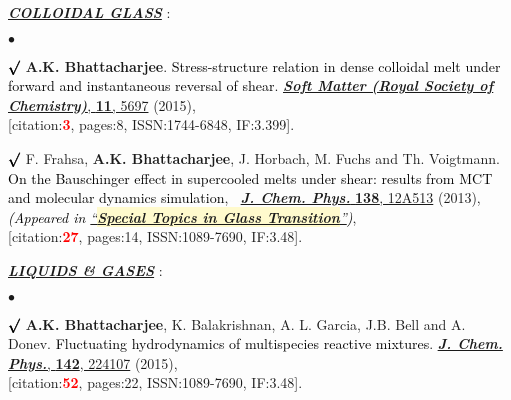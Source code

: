 \documentclass[margin,line]{res}
\newenvironment{list1}{
  \begin{list}{\ding{113}}{%
      \setlength{\itemsep}{0in}
      \setlength{\parsep}{0in} \setlength{\parskip}{0in}
      \setlength{\topsep}{0in} \setlength{\partopsep}{0in} 
      \setlength{\leftmargin}{0.17in}}}{\end{list}}
\newenvironment{list2}{
  \begin{list}{$\bullet$}{%
      \setlength{\itemsep}{0in}
      \setlength{\parsep}{0in} \setlength{\parskip}{0in}
      \setlength{\topsep}{0in} \setlength{\partopsep}{0in} 
      \setlength{\leftmargin}{0.2in}}}{\end{list}}
\begin{document}
\begin{resume}
\vspace{4mm}
\begin{list1}
\item[] \textcolor{alizarin}{\ul{\textbf{\textit{COLLOIDAL GLASS}}} :}
\end{list1}
\vspace{2mm}
\begin{list2}
\item[$\pmb\surd$] {\bf A.K. Bhattacharjee}. \textcolor{black}{\textsf{Stress-structure relation in dense colloidal melt 
under forward and instantaneous reversal of shear}}. \href{http://pubs.rsc.org/en/content/articlelanding/2015/sm/c4sm02790f}{
\underline{\textit{\textbf{Soft Matter (Royal Society of Chemistry)}}}, {\bf 11}, 5697} (2015), \\{[citation:\textcolor{red}{\bf 3}, 
pages:8, ISSN:1744-6848, IF:3.399]}. 
\vspace{4mm}
\item[$\pmb\surd$] F. Frahsa, {\bf A.K. Bhattacharjee}, J. Horbach, M. Fuchs and Th. Voigtmann. \textcolor{black}{\textsf{On the Bauschinger 
effect in supercooled melts under shear: results from MCT and molecular dynamics simulation}},$\;\;$ 
\href{https://aip.scitation.org/doi/abs/10.1063/1.4770336}{\underline{\textit{\textbf{J. Chem. Phys.}}} {\bf 138}, 12A513} (2013), 
\textcolor{black}{\small \it {(Appeared in \href{https://amitbny.github.io/akb.github.io/doc/JCP_ST.pdf}{``\colorbox{lemonchiffon}{\bf Special Topics in Glass Transition}''})}}, \\{[citation:\textcolor{red}{\bf 27}, pages:14, ISSN:1089-7690, IF:3.48]}.
\end{list2}
\vspace{4mm}
\begin{list1}
\item[] \textcolor{alizarin}{\ul{\textbf{\textit{LIQUIDS \& GASES}}} :}
\end{list1}
\vspace{2mm}
\begin{list2}
\item[$\pmb\surd$] {\bf A.K. Bhattacharjee}, K. Balakrishnan, A. L. Garcia, J.B. Bell and A. Donev. \textcolor{black}{\textsf{
Fluctuating hydrodynamics of multispecies reactive mixtures}}. \href{http://scitation.aip.org/content/aip/journal/jcp/142/22/10.1063/1.4922308}{
\underline{\textit{\textbf{J. Chem. Phys.}}}, {\bf 142}, 224107} (2015), \\{[citation:\textcolor{red}{\bf 52}, pages:22, ISSN:1089-7690, IF:3.48]}.
\vspace{4mm}

\end{list2}
\end{resume}
\end{document}
